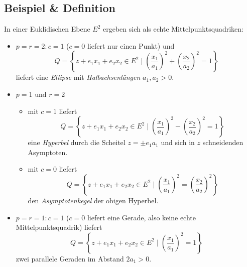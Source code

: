 \subsection{Beispiel \& Definition}
	In einer Euklidischen Ebene $ E^2 $ ergeben sich als echte Mittelpunktsquadriken:
		\begin{itemize}
			\item $ p=r=2 : c=1 $ ($ c=0 $ liefert nur einen Punkt) und
				\[ Q=\left\{z+e_1x_1+e_2x_2\in E^2\mid \left(\frac{x_1}{a_1}\right)^2+\left(\frac{x_2}{a_2}\right)^2 = 1\right\} \]
				liefert eine \emph{Ellipse} mit \emph{Halbachsenlängen} $ a_1,a_2 > 0$.
			\item $ p=1 $ und $ r=2 $
				\begin{itemize}
					\item mit $ c=1 $ liefert
						\[ Q=\left\{z+e_1x_1+e_2x_2\in E^2\mid \left(\frac{x_1}{a_1}\right)^2-\left(\frac{x_2}{a_2}\right)^2 = 1\right\} \]
						eine \emph{Hyperbel} durch die Scheitel $ z=\pm e_1a_1 $ und sich in $ z $ schneidenden Asymptoten.
	        \begin{figure}[H]\centering
     		    
    	    \end{figure}
   
					\item mit $ c=0 $ liefert
						\[ Q=\left\{z+e_1x_1+e_2x_2\in E^2\mid \left(\frac{x_1}{a_1}\right)^2=\left(\frac{x_2}{a_2}\right)^2 \right\} \]
						den \emph{Asymptotenkegel} der obigen Hyperbel.
				\end{itemize}
			\item $ p=r=1 : c=1 $ ($ c=0 $ liefert eine Gerade, also keine echte Mittelpunktsquadrik) liefert
				\[ Q=\left\{z+e_1x_1+e_2x_2\in E^2\mid \left(\frac{x_1}{a_1}\right)^2 = 1\right\} \]
			zwei parallele Geraden im Abstand $ 2a_1 > 0$.
		\end{itemize}
	